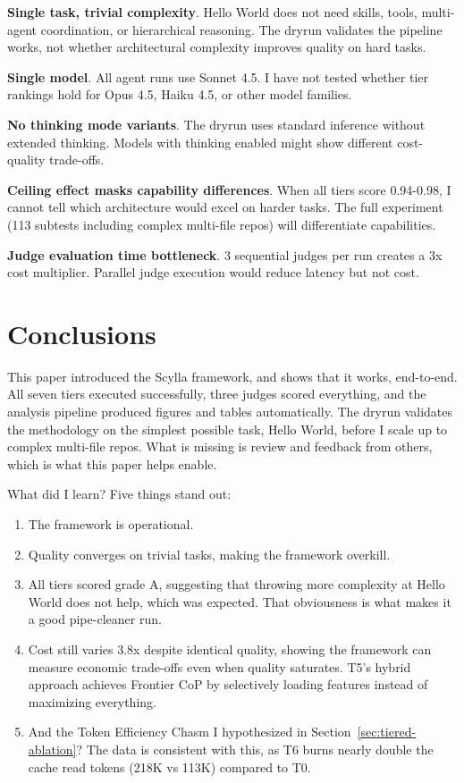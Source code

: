 \documentclass[11pt]{article}
\begin{document}
\textbf{Single task, trivial complexity}. Hello World does not need skills, tools,
multi-agent coordination, or hierarchical reasoning. The dryrun validates the
pipeline works, not whether architectural complexity improves quality on hard
tasks.

\textbf{Single model}. All agent runs use Sonnet 4.5. I have not tested whether tier
rankings hold for Opus 4.5, Haiku 4.5, or other model families.

\textbf{No thinking mode variants}. The dryrun uses standard inference without extended
thinking. Models with thinking enabled might show different cost-quality
trade-offs.

\textbf{Ceiling effect masks capability differences}. When all tiers score 0.94-0.98, I
cannot tell which architecture would excel on harder tasks. The full experiment
(113 subtests including complex multi-file repos) will differentiate
capabilities.

\textbf{Judge evaluation time bottleneck}. 3 sequential judges per run creates a 3x cost
multiplier. Parallel judge execution would reduce latency but not cost.

\section{Conclusions}

This paper introduced the Scylla framework, and shows that it works, end-to-end.
All seven tiers executed successfully, three judges scored everything, and the
analysis pipeline produced figures and tables automatically. The dryrun
validates the methodology on the simplest possible task, Hello World, before I
scale up to complex multi-file repos. What is missing is review and feedback
from others, which is what this paper helps enable.

What did I learn? Five things stand out:

\begin{enumerate}
\item The framework is operational.
\item Quality converges on trivial tasks, making the framework overkill.
\item All tiers scored grade A, suggesting that throwing more complexity at Hello World does not help, which was expected. That obviousness is what makes it a good pipe-cleaner run.
\item Cost still varies 3.8x despite identical quality, showing the framework can measure economic trade-offs even when quality saturates. T5's hybrid approach achieves Frontier CoP by selectively loading features instead of maximizing everything.
\item And the Token Efficiency Chasm I hypothesized in Section~\ref{sec:tiered-ablation}? The data is consistent with this, as T6 burns nearly double the cache read tokens (218K vs 113K) compared to T0.
\end{enumerate}
\end{document}

